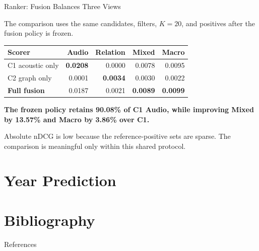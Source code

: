 \documentclass{beamer}
\begin{document}
\begin{frame}{Ranker: Fusion Balances Three Views}

{\small The comparison uses the same candidates, filters, $K=20$, and positives after the fusion policy is frozen.}

\vspace{.16cm}
\begin{center}
\renewcommand{\arraystretch}{1.16}
\setlength{\tabcolsep}{10pt}
\small
\begin{tabular}{l r r r r}
  \toprule
  \textbf{Scorer} & \textbf{Audio} & \textbf{Relation} & \textbf{Mixed} & \textbf{Macro} \\
  \midrule
  C1 acoustic only & \textbf{0.0208} & 0.0000 & 0.0078 & 0.0095 \\
  C2 graph only & 0.0001 & \textbf{0.0034} & 0.0030 & 0.0022 \\
  \midrule
  \textbf{Full fusion} & 0.0187 & 0.0021 & \textbf{\color{projectteal}0.0089} & \textbf{\color{projectteal}0.0099} \\
  \bottomrule
\end{tabular}
\end{center}

\vspace{.24cm}
\begin{center}
  \large\bfseries The frozen policy retains 90.08\% of C1 Audio, while improving Mixed by 13.57\% and Macro by 3.86\% over C1.
\end{center}

\vfill
{\footnotesize Absolute nDCG is low because the reference-positive sets are sparse. The comparison is meaningful only within this shared protocol.}

\end{frame}



\section{Year Prediction}





\section{Bibliography}

\begin{frame}[allowframebreaks]{References}

\nocite{*}
\printbibliography[heading=none]

\end{frame}

\thankframe
\end{document}
